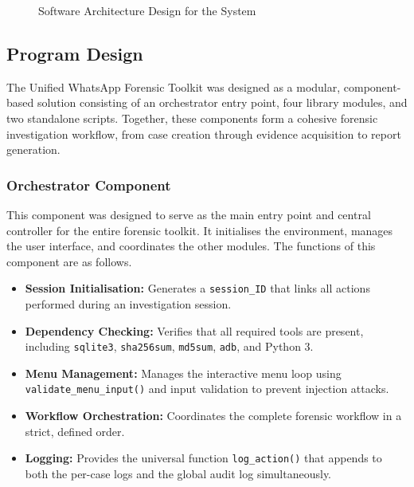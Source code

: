 \documentclass[12pt,a4paper]{report}
\begin{document}
\begin{figure}[h]
    \centering
    \caption{Software Architecture Design for the System}
    \label{fig:software_architecture}
\end{figure}

\subsection{Program Design}

The Unified WhatsApp Forensic Toolkit was designed as a modular, component-based solution consisting of an orchestrator entry point, four library modules, and two standalone scripts. Together, these components form a cohesive forensic investigation workflow, from case creation through evidence acquisition to report generation.

\subsubsection{Orchestrator Component}

This component was designed to serve as the main entry point and central controller for the entire forensic toolkit. It initialises the environment, manages the user interface, and coordinates the other modules. The functions of this component are as follows.

\begin{itemize}
    \item \textbf{Session Initialisation:} Generates a \texttt{session\_ID} that links all actions performed during an investigation session.
    \item \textbf{Dependency Checking:} Verifies that all required tools are present, including \texttt{sqlite3}, \texttt{sha256sum}, \texttt{md5sum}, \texttt{adb}, and Python 3.
    \item \textbf{Menu Management:} Manages the interactive menu loop using \texttt{validate\_menu\_input()} and input validation to prevent injection attacks.
    \item \textbf{Workflow Orchestration:} Coordinates the complete forensic workflow in a strict, defined order.
    \item \textbf{Logging:} Provides the universal function \texttt{log\_action()} that appends to both the per-case logs and the global audit log simultaneously.
\end{itemize}
\end{document}
